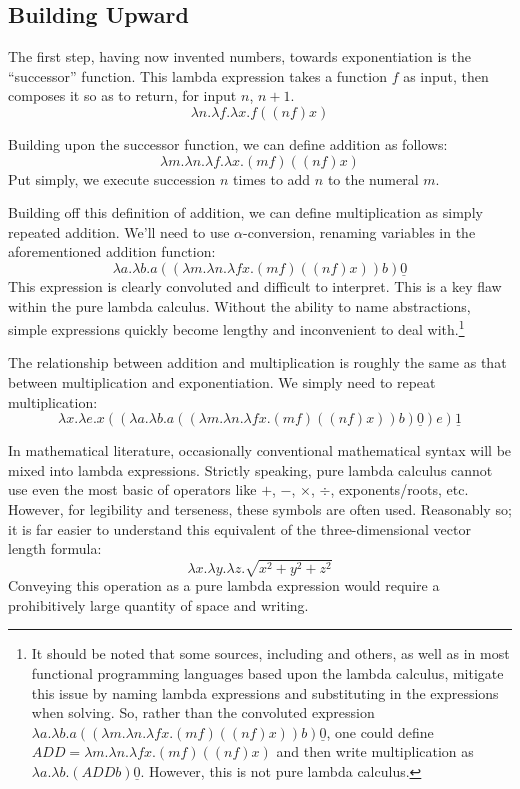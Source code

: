 \documentclass[twocolumn,titlepage,12pt]{article}
\begin{document}
\subsection{Building Upward}
The first step, having now invented numbers, towards exponentiation is the ``successor'' function. This lambda expression takes a function $f$ as input, then composes it so as to return, for input $n$, $n+1$.
$$\lambda n.\lambda f.\lambda x.f((n f) x)$$

Building upon the successor function, we can define addition as follows:
$$\lambda m.\lambda n.\lambda f.\lambda x.(m f) ((n f) x)$$
Put simply, we execute succession $n$ times to add $n$ to the numeral $m$.

Building off this definition of addition, we can define multiplication as simply repeated addition. We'll need to use $\alpha$-conversion, renaming variables in the aforementioned addition function:
$$\lambda a.\lambda b.a ((\lambda m.\lambda n.\lambda fx.(m f) ((n f) x)) b) \underline{0}$$
This expression is clearly convoluted and difficult to interpret. This is a key flaw within the pure lambda calculus. Without the ability to name abstractions, simple expressions quickly become lengthy and inconvenient to deal with.\footnote{It should be noted that some sources, including \cite{cornelllc}\cite{rojastutorial} and others, as well as in most functional programming languages based upon the lambda calculus, mitigate this issue by naming lambda expressions and substituting in the expressions when solving. So, rather than the convoluted expression $\lambda a.\lambda b.a ((\lambda m.\lambda n.\lambda fx.(m f) ((n f) x)) b) \underline{0}$, one could define $ADD=\lambda m.\lambda n.\lambda fx.(m f) ((n f) x)$ and then write multiplication as $\lambda a.\lambda b.(ADD b) \underline{0}$. However, this is not pure lambda calculus.}

The relationship between addition and multiplication is roughly the same as that between multiplication and exponentiation. We simply need to repeat multiplication:
$$\lambda x.\lambda e.x ((\lambda a.\lambda b.a ((\lambda m.\lambda n.\lambda fx.(m f) ((n f) x)) b) \underline{0}) e) \underline{1}$$

In mathematical literature, occasionally conventional mathematical syntax will be mixed into lambda expressions. Strictly speaking, pure lambda calculus cannot use even the most basic of operators like $+$, $-$, $\times$, $\div$, exponents/roots, etc. However, for legibility and terseness, these symbols are often used. Reasonably so; it is far easier to understand this equivalent of the three-dimensional vector length formula:
$$\lambda x.\lambda y.\lambda z.\sqrt{x^2+y^2+z^2}$$
Conveying this operation as a pure lambda expression would require a prohibitively large quantity of space and writing.
\end{document}

